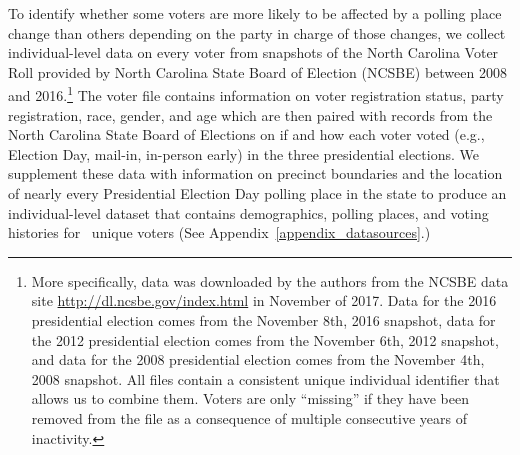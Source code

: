 \documentclass[12pt]{article}
\begin{document}

To identify whether some voters are more likely to be affected by a polling place change than others depending on the party in charge of those changes, we collect individual-level data on every voter from snapshots of the North Carolina Voter Roll provided by North Carolina State Board of Election (NCSBE) between 2008 and 2016.\footnote{More specifically, data was downloaded by the authors from the NCSBE data site \url{http://dl.ncsbe.gov/index.html} in November of 2017. Data for the 2016 presidential election comes from the November 8th, 2016 snapshot, data for the 2012 presidential election comes from the November 6th, 2012 snapshot, and data for the 2008 presidential election comes from the November 4th, 2008 snapshot.  All files contain a consistent unique individual identifier that allows us to combine them.  Voters are only ``missing'' if they have been removed from the file as a consequence of multiple consecutive years of inactivity.} The voter file contains information on voter registration status, party registration, race, gender, and age which are then paired with records from the North Carolina State Board of Elections on if and how each voter voted (e.g., Election Day, mail-in, in-person early) in the three presidential elections.  We supplement these data with information on precinct boundaries and the location of nearly every Presidential Election Day polling place in the state to produce an individual-level dataset that contains demographics, polling places, and voting histories for \unskip~unique voters (See Appendix~\ref{appendix_datasources}.)
\end{document}

